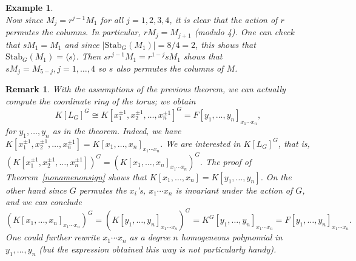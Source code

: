 \documentclass[12pt]{article}
\theoremstyle{plain}
\newtheorem{example}[theorem]{Example}
\newtheorem*{remark}{Remark}
\begin{document}
\begin{example}
$$$$
Now since $M_j=r^{j-1}M_1$ for all $j=1,2,3,4$, it is clear that the action of 
$r$ permutes the columns.  In particular, $rM_j=M_{j+1}$ (modulo 4).  One can check that $sM_1=M_1$ and since $|\textrm{Stab}_G(M_1)|=8/4=2$, this shows that $\textrm{Stab}_G(M_1)=\langle s\rangle$.
Then $sr^{j-1}M_1=r^{1-j}sM_1$ shows that $sM_j=M_{5-j},j=1,\dots,4$ so $s$ also permutes the columns of $M$.
\end{example} 

\begin{remark}
With the assumptions of the previous theorem, we can actually compute
the coordinate ring of the torus; we obtain $$K[L_G]^G \cong K[x^{\pm
    1}_1, x^{\pm 1}_2, \ldots , x^{\pm 1}_n]^G = F[y_1, \ldots ,
  y_n]_{x_1\cdots x_n},$$ for $y_1,\dots,y_n$ as in the theorem.
Indeed, we have $K[x^{\pm 1}_1, x^{\pm 1}_2, \ldots , x^{\pm 1}_n] =
K[x_1, \ldots , x_n]_{x_1\cdots x_n}.$ We are interested in
$K[L_G]^G$, that is, $\left( K[x^{\pm 1}_1, x^{\pm 1}_2, \ldots ,
  x^{\pm 1}_n] \right)^G = \left(K[x_1, \ldots , x_n]_{x_1\cdots x_n}
\right) ^G.$ The proof of Theorem~\ref{nonamenonsign} shows that
$K[x_1, \ldots , x_n] = K[y_1, \ldots , y_n]$.  On the other hand
since $G$ permutes the $x_i$'s, $x_1\cdots x_n$ is invariant under the
action of $G$, and we can conclude $$\left( K[x_1, \ldots ,
  x_n]_{x_1\cdots x_n}\right)^G = \left( K[y_1, \ldots ,
  y_n]_{x_1\cdots x_n} \right)^G = K^G [y_1, \ldots , y_n]_{x_1\cdots
  x_n} = F[y_1, \ldots , y_n]_{x_1\cdots x_n}.$$ One could further
rewrite $x_1\cdots x_n$ as a degree $n$ homogeneous polynomial in
$y_1,\dots,y_n$ (but the expression obtained this way is not
particularly handy).
\end{remark}
\end{document}
